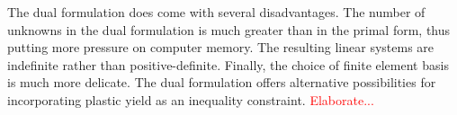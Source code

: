 \documentclass{article}
\theoremstyle{definition}
\theoremstyle{plain}
\begin{document}
The dual formulation does come with several disadvantages.
The number of unknowns in the dual formulation is much greater than in the primal form, thus putting more pressure on computer memory.
The resulting linear systems are indefinite rather than positive-definite.
Finally, the choice of finite element basis is much more delicate.
The dual formulation offers alternative possibilities for incorporating plastic yield as an inequality constraint.
\textcolor{red}{Elaborate...}


\pagebreak



\end{document}
